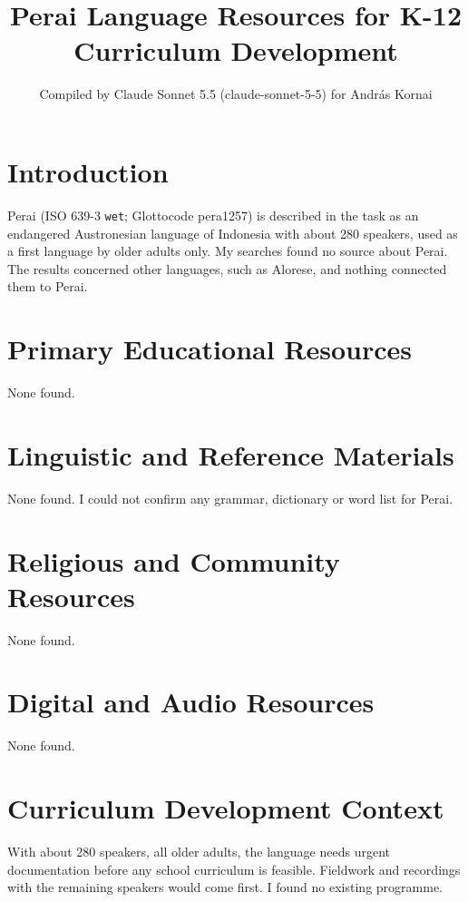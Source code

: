 \documentclass[12pt]{article}
\title{Perai Language Resources for K-12 Curriculum Development}
\author{Compiled by Claude Sonnet 5.5 (claude-sonnet-5-5) for Andr\'as Kornai}
\date{}
\begin{document}
\maketitle

\section{Introduction}
Perai (ISO 639-3 \texttt{wet}; Glottocode pera1257) is described in the task as an endangered Austronesian language of Indonesia with about 280 speakers, used as a first language by older adults only. My searches found no source about Perai. The results concerned other languages, such as Alorese, and nothing connected them to Perai.

\section{Primary Educational Resources}
None found.

\section{Linguistic and Reference Materials}
None found. I could not confirm any grammar, dictionary or word list for Perai.

\section{Religious and Community Resources}
None found.

\section{Digital and Audio Resources}
None found.

\section{Curriculum Development Context}
With about 280 speakers, all older adults, the language needs urgent documentation before any school curriculum is feasible. Fieldwork and recordings with the remaining speakers would come first. I found no existing programme.
\end{document}
